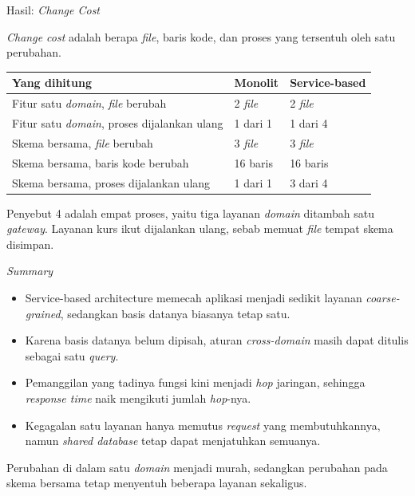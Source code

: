 \documentclass[aspectratio=169, table, 12pt]{beamer}
\begin{document}
\begin{frame}{{\Large Hasil: \textit{Change Cost}}}
  \vspace{4pt}
  \raggedright
  {\small \textit{Change cost} adalah berapa \textit{file}, baris kode, dan
  proses yang tersentuh oleh satu perubahan.}

  \vspace{4pt}
  \centering
  \small
  \begin{tabularx}{0.9\textwidth}{|X|l|l|}
    \hline
    \textbf{Yang dihitung} & \textbf{Monolit} & \textbf{Service-based} \\
    \hline
    Fitur satu \textit{domain}, \textit{file} berubah & 2 \textit{file} & 2 \textit{file} \\
    \hline
    Fitur satu \textit{domain}, proses dijalankan ulang & 1 dari 1 & 1 dari 4 \\
    \hline
    Skema bersama, \textit{file} berubah & 3 \textit{file} & 3 \textit{file} \\
    \hline
    Skema bersama, baris kode berubah & 16 baris & 16 baris \\
    \hline
    Skema bersama, proses dijalankan ulang & 1 dari 1 & 3 dari 4 \\
    \hline
  \end{tabularx}

  \vspace{6pt}
  \raggedright
  {\small Penyebut 4 adalah empat proses, yaitu tiga layanan \textit{domain}
  ditambah satu \textit{gateway}. Layanan kurs ikut dijalankan ulang, sebab memuat
  \textit{file} tempat skema disimpan.}
\end{frame}

\begin{frame}{{\Large \textit{Summary}}}
  \vspace{10pt}
  \begin{itemize}\small
    \item Service-based architecture memecah aplikasi menjadi sedikit layanan
          \textit{coarse-grained}, sedangkan basis datanya biasanya tetap satu.
    \item Karena basis datanya belum dipisah, aturan \textit{cross-domain} masih
          dapat ditulis sebagai satu \textit{query}.
    \item Pemanggilan yang tadinya fungsi kini menjadi \textit{hop} jaringan,
          sehingga \textit{response time} naik mengikuti jumlah \textit{hop}-nya.
    \item Kegagalan satu layanan hanya memutus \textit{request} yang
          membutuhkannya, namun \textit{shared database} tetap dapat menjatuhkan
          semuanya.
  \end{itemize}

  \vspace{10pt}
  {\small Perubahan di dalam satu \textit{domain} menjadi murah, sedangkan
  perubahan pada skema bersama tetap menyentuh beberapa layanan sekaligus.}
\end{frame}
\end{document}

